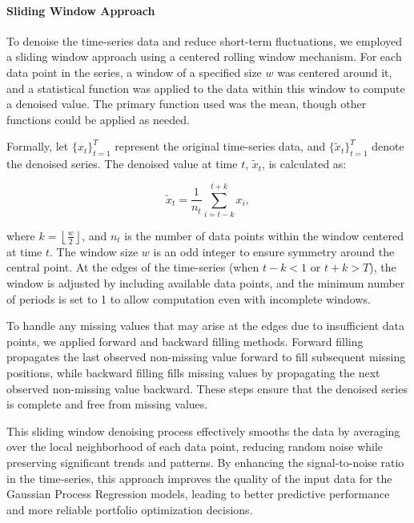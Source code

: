 \paragraph{Sliding Window Approach}

To denoise the time-series data and reduce short-term fluctuations, we employed a sliding window approach using a centered rolling window mechanism. For each data point in the series, a window of a specified size $w$ was centered around it, and a statistical function was applied to the data within this window to compute a denoised value. The primary function used was the mean, though other functions could be applied as needed.

Formally, let $\{ x_t \}_{t=1}^T$ represent the original time-series data, and $\{ \tilde{x}_t \}_{t=1}^T$ denote the denoised series. The denoised value at time $t$, $\tilde{x}_t$, is calculated as:

\begin{equation}
\tilde{x}_t = \frac{1}{n_t} \sum_{i = t - k}^{t + k} x_i,
\end{equation}

where $k = \left\lfloor \frac{w}{2} \right\rfloor$, and $n_t$ is the number of data points within the window centered at time $t$. The window size $w$ is an odd integer to ensure symmetry around the central point. At the edges of the time-series (when $t - k < 1$ or $t + k > T$), the window is adjusted by including available data points, and the minimum number of periods is set to 1 to allow computation even with incomplete windows.

To handle any missing values that may arise at the edges due to insufficient data points, we applied forward and backward filling methods. Forward filling propagates the last observed non-missing value forward to fill subsequent missing positions, while backward filling fills missing values by propagating the next observed non-missing value backward. These steps ensure that the denoised series is complete and free from missing values.

This sliding window denoising process effectively smooths the data by averaging over the local neighborhood of each data point, reducing random noise while preserving significant trends and patterns. By enhancing the signal-to-noise ratio in the time-series, this approach improves the quality of the input data for the Gaussian Process Regression models, leading to better predictive performance and more reliable portfolio optimization decisions.

